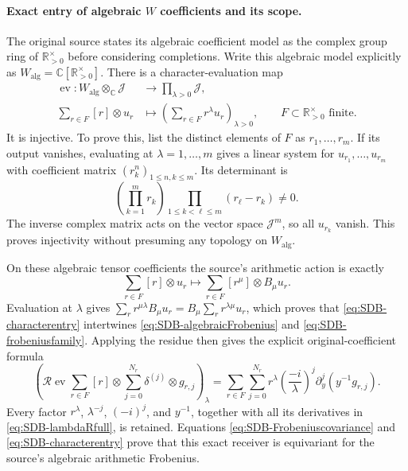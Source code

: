\paragraph{Exact entry of algebraic $W$ coefficients and its scope.}
The original source states its algebraic coefficient model as the
complex group ring of $\mathbb R_{>0}^{\times}$ before considering
completions. Write this algebraic model explicitly as
$W_{\mathrm{alg}}=\mathbb C[\mathbb R_{>0}^{\times}]$.
There is a character-evaluation map
\begin{equation}\tag{SDB55}\label{eq:SDB-characterentry}
 \begin{aligned}
 \operatorname{ev}:W_{\mathrm{alg}}\otimes_\mathbb C\mathcal J
       &\longrightarrow\prod_{\lambda>0}\mathcal J,\\
 \sum_{r\in F}[r]\otimes u_r
       &\longmapsto
           \left(\sum_{r\in F}r^\lambda u_r\right)_{\lambda>0},
       \qquad F\subset\mathbb R_{>0}^{\times}\text{ finite}.
 \end{aligned}
\end{equation}
It is injective. To prove this, list the distinct elements of $F$
as $r_1,\ldots,r_m$. If its output vanishes, evaluating at
$\lambda=1,\ldots,m$ gives a linear system for
$u_{r_1},\ldots,u_{r_m}$ with coefficient matrix
$(r_k^n)_{1\leq n,k\leq m}$. Its determinant is
\[
 \left(\prod_{k=1}^m r_k\right)
       \prod_{1\leq k<\ell\leq m}(r_\ell-r_k)\ne0.
\]
The inverse complex matrix acts on the vector space $\mathcal J^m$,
so all $u_{r_k}$ vanish. This proves injectivity without presuming
any topology on $W_{\mathrm{alg}}$.

On these algebraic tensor coefficients the source's arithmetic action
is exactly
\begin{equation}\tag{SDB56}\label{eq:SDB-algebraicFrobenius}
 \sum_{r\in F}[r]\otimes u_r
       \longmapsto\sum_{r\in F}[r^\mu]\otimes B_\mu u_r.
\end{equation}
Evaluation at $\lambda$ gives
$\sum_r r^{\mu\lambda}B_\mu u_r
=B_\mu\sum_r r^{\lambda\mu}u_r$, which proves that
\eqref{eq:SDB-characterentry} intertwines
\eqref{eq:SDB-algebraicFrobenius} and
\eqref{eq:SDB-frobeniusfamily}. Applying the residue then gives the
explicit original-coefficient formula
\begin{equation}\tag{SDB57}\label{eq:SDB-Wresidue}
 \left(\mathcal R\operatorname{ev}
     \sum_{r\in F}[r]\otimes
       \sum_{j=0}^{N_r}\delta^{(j)}\otimes g_{r,j}\right)_\lambda
 =\sum_{r\in F}\sum_{j=0}^{N_r}
       r^\lambda\left(\frac{-i}{\lambda}\right)^j
                    \partial_y^j(y^{-1}g_{r,j}).
\end{equation}
Every factor $r^\lambda$, $\lambda^{-j}$, $(-i)^j$, and $y^{-1}$,
together with all its derivatives in \eqref{eq:SDB-lambdaRfull},
is retained. Equations \eqref{eq:SDB-Frobeniuscovariance} and
\eqref{eq:SDB-characterentry} prove that this exact receiver is
equivariant for the source's algebraic arithmetic Frobenius.

